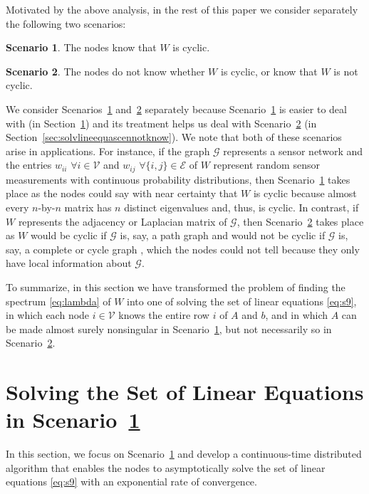 \documentclass[11pt]{article}
\theoremstyle{plain}
\theoremstyle{definition}
\newtheorem{scenario}{Scenario}
\theoremstyle{remark}
\begin{document}
Motivated by the above analysis, in the rest of this paper we consider separately the following two scenarios:

\begin{scenario}\label{sce:know}
The nodes know that $W$ is cyclic.
\end{scenario}

\begin{scenario}\label{sce:notknow}
The nodes do not know whether $W$ is cyclic, or know that $W$ is not cyclic.
\end{scenario}

We consider Scenarios~\ref{sce:know} and~\ref{sce:notknow} separately because Scenario~\ref{sce:know} is easier to deal with (in Section~\ref{sec:solvlineequascenknow}) and its treatment helps us deal with Scenario~\ref{sce:notknow} (in Section~\ref{sec:solvlineequascennotknow}). We note that both of these scenarios arise in applications. For instance, if the graph $\mathcal{G}$ represents a sensor network and the entries $w_{ii}$ $\forall i\in\mathcal{V}$ and $w_{ij}$ $\forall\{i,j\}\in\mathcal{E}$ of $W$ represent random sensor measurements with continuous probability distributions, then Scenario~\ref{sce:know} takes place as the nodes could say with near certainty that $W$ is cyclic because almost every $n$-by-$n$ matrix has $n$ distinct eigenvalues and, thus, is cyclic. In contrast, if $W$ represents the adjacency or Laplacian matrix of $\mathcal{G}$, then Scenario~\ref{sce:notknow} takes place as $W$ would be cyclic if $\mathcal{G}$ is, say, a path graph \cite{Chung97} and would not be cyclic if $\mathcal{G}$ is, say, a complete or cycle graph \cite{Chung97}, which the nodes could not tell because they only have local information about $\mathcal{G}$.

To summarize, in this section we have transformed the problem of finding the spectrum \eqref{eq:lambda} of $W$ into one of solving the set of linear equations \eqref{eq:s9}, in which each node $i\in\mathcal{V}$ knows the entire row $i$ of $A$ and $b$, and in which $A$ can be made almost surely nonsingular in Scenario~\ref{sce:know}, but not necessarily so in Scenario~\ref{sce:notknow}.

\section{Solving the Set of Linear Equations in Scenario~\ref{sce:know}}\label{sec:solvlineequascenknow}

In this section, we focus on Scenario~\ref{sce:know} and develop a continuous-time distributed algorithm that enables the nodes to asymptotically solve the set of linear equations \eqref{eq:s9} with an exponential rate of convergence.
\end{document}
